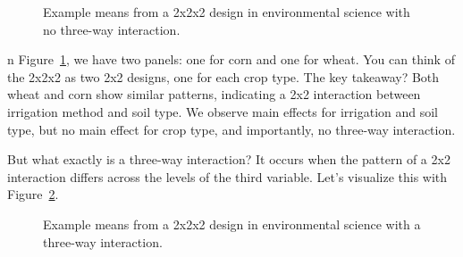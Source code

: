 \documentclass[
  letterpaper,
  DIV=11,
  numbers=noendperiod]{scrreprt}
\begin{document}
\begin{figure}


\caption{\label{fig-11222}Example means from a 2x2x2 design in
environmental science with no three-way interaction.}

\end{figure}%

n Figure~\ref{fig-11222}, we have two panels: one for corn and one for
wheat. You can think of the 2x2x2 as two 2x2 designs, one for each crop
type. The key takeaway? Both wheat and corn show similar patterns,
indicating a 2x2 interaction between irrigation method and soil type. We
observe main effects for irrigation and soil type, but no main effect
for crop type, and importantly, no three-way interaction.

But what exactly is a three-way interaction? It occurs when the pattern
of a 2x2 interaction differs across the levels of the third variable.
Let's visualize this with Figure~\ref{fig-11222int}.

\begin{figure}


\caption{\label{fig-11222int}Example means from a 2x2x2 design in
environmental science with a three-way interaction.}

\end{figure}%
\end{document}
